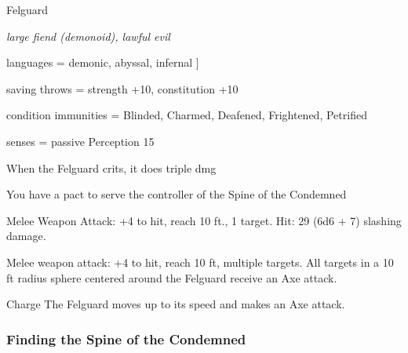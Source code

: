 \begin{monsterbox}{Felguard}
	\begin{hangingpar}
		\textit{large fiend (demonoid), lawful evil}
	\end{hangingpar}
	\dndline%
	\basics[armorclass = 16 Plate, hitpoints = 50 + 3 $\times$ player level, speed = 50 ft]
	\dndline%
	\stats[STR = \stat{24}, DEX = \stat{18}, CON = \stat{24}, INT = \stat{12}, WIS = \stat{13},	CHA = \stat{19}]
	\dndline
	languages = {demonic, abyssal, infernal}
	]
	
	\dndline%
	
	saving throws = strength +10, constitution +10

	condition immunities =  Blinded, Charmed, Deafened, Frightened, Petrified 
	
	senses = passive Perception 15
	
	\dndline%
	\begin{monsteraction}
		When the Felguard crits, it does triple dmg
	\end{monsteraction}
	\begin{monsteraction}
		You have a pact to serve the controller of the Spine of the Condemned
	\end{monsteraction}
	\begin{monsteraction}[Axe]
		Melee Weapon Attack: +4 to hit, reach 10 ft., 1 target. Hit: 29 (6d6 + 7) slashing damage. 
	\end{monsteraction}
	\begin{monsteraction}
		Melee weapon attack: +4 to hit, reach 10 ft, multiple targets. All targets in a 10 ft radius sphere centered around the Felguard receive an Axe attack.
	\end{monsteraction}
	\begin{monsteraction}{Charge}
		The Felguard moves up to its speed and makes an Axe attack. 
	\end{monsteraction}
\end{monsterbox}



\subsubsection{Finding the Spine of the Condemned}